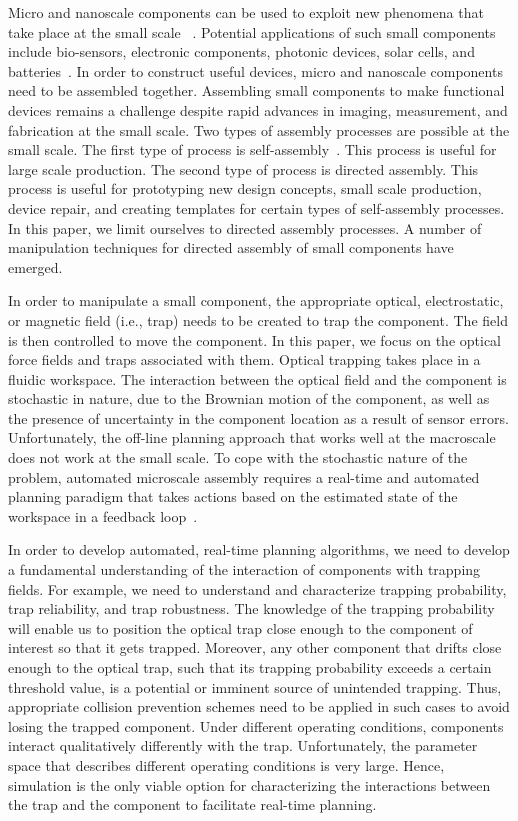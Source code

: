 \documentclass[twocolumn,10pt]{asme2ej}
\begin{document}
Micro and nanoscale components can be
used to exploit new phenomena that take place at the small scale
~\cite{Bhus04}. Potential applications of such small components include
bio-sensors, electronic components, photonic devices, solar cells, and
batteries~\cite{Niem04,Wils02}.  In order to construct useful devices, micro and nanoscale components need to be
assembled together. Assembling small components to make functional
devices remains a challenge despite rapid advances in imaging,
measurement, and fabrication at the small scale. Two types of assembly
processes are possible at the small scale. The first type of process is
self-assembly~\cite{Requ06}. This process is useful for large scale
production. The second type of process is directed assembly. This
process is useful for prototyping new design concepts, small scale
production, device repair, and creating templates for certain types of
self-assembly processes. In this paper, we limit ourselves to directed
assembly processes. A number of manipulation techniques for directed
assembly of small components have emerged.

In order to manipulate a small component, the appropriate optical,
electrostatic, or magnetic field (i.e., trap) needs to be created to
trap the component. The field is then controlled to move the component. 
In this paper, we focus on the optical force fields and traps associated with them. 
Optical trapping takes place
in a fluidic workspace. The interaction between the optical field and the
component is stochastic in nature, due to the Brownian motion of the
component, as well as the presence of uncertainty in the component location as
a result of sensor errors. Unfortunately, the off-line planning
approach that works well at the macroscale does not work at the
small scale. To cope with the stochastic nature of the problem,
automated microscale assembly requires a real-time and automated
planning paradigm that takes actions based on the estimated state of
the workspace in a feedback loop~\cite{Banerjee:2010:ieee}.

In order to develop automated, real-time planning algorithms, we need
to develop a fundamental understanding of the interaction of
components with trapping fields. For example, we need to
understand and characterize trapping probability, trap reliability,
and trap robustness. The knowledge of the trapping probability will
enable us to position the optical trap close enough to the
component of interest so that it gets trapped. Moreover, any other
component that drifts close enough to the optical trap, such that its
trapping probability exceeds a certain threshold value, is a potential
or imminent source of unintended trapping. Thus, appropriate collision
prevention schemes need to be applied in such cases to avoid losing
the trapped component. Under different operating conditions,
components interact qualitatively differently with the
trap. Unfortunately, the parameter space that describes different
operating conditions is very large. Hence, simulation is the only
viable option for characterizing the interactions between the trap and
the component to facilitate real-time planning.   
\end{document}

